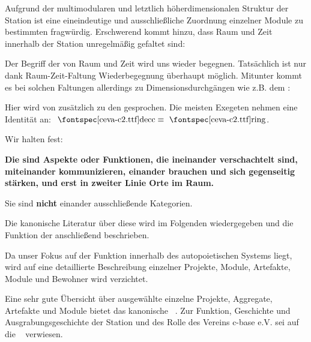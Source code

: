     
    Aufgrund der multimodularen und letztlich höherdimensionalen Struktur der Station ist eine eineindeutige und ausschließliche Zuordnung einzelner Module zu bestimmten  fragwürdig. Erschwerend kommt hinzu, dass Raum und Zeit innerhalb der Station unregelmäßig gefaltet sind: 


Der Begriff der  von Raum und Zeit wird uns wieder begegnen. Tatsächlich ist nur dank Raum-Zeit-Faltung Wiederbegegnung überhaupt möglich. Mitunter kommt es bei solchen Faltungen allerdings zu Dimensionsdurchgängen wie z.B. dem :


Hier wird von  zusätzlich zu den  gesprochen. Die meisten Exe\-ge\-ten nehmen eine Identität an: $\text{\ceva{decc}} \equiv \text{\ceva{ring}}$.

Wir halten fest: 

\textbf{Die  sind Aspekte oder Funktionen, die ineinander verschachtelt sind, miteinander kommunizieren, einander brauchen und sich gegenseitig stärken, und erst in zweiter Linie  Orte im Raum.} 

Sie sind \textbf{nicht} einander ausschließende Kategorien.
   
Die kanonische Literatur über diese  wird im Folgenden wiedergegeben und die Funktion der  anschließend beschrieben. 

Da unser Fokus auf der Funktion innerhalb des autopoietischen Systems  liegt, wird auf eine detaillierte Beschreibung einzelner Projekte, Module, Artefakte, Module und Bewohner wird verzichtet. 
    
Eine sehr gute Übersicht über ausgewählte einzelne Projekte, Aggregate, Artefakte und Module bietet das kanonische ~\cite{cbasebook}. Zur Funktion, Geschichte und Ausgrabungsgeschichte der Station und des Rolle des Vereins c-base e.V. sei auf die ~\cite{cbasepressemap} verwiesen.